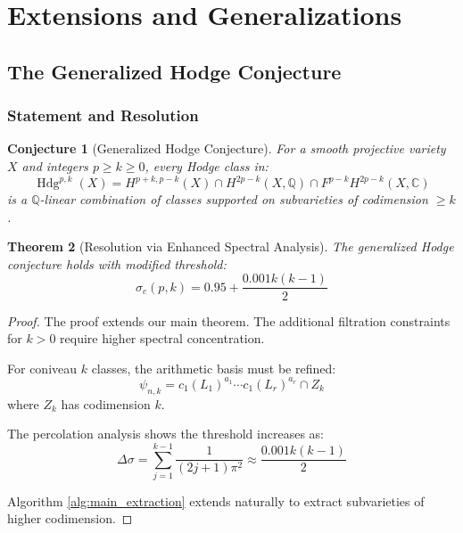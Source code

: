 \documentclass[11pt,a4paper]{article}
\theoremstyle{plain}
\newtheorem{theorem}{Theorem}[section]
\newtheorem{conjecture}[theorem]{Conjecture}
\theoremstyle{definition}
\theoremstyle{remark}
\DeclareMathOperator{\Hdg}{Hdg}
\newcommand{\Q}{\mathbb{Q}}
\newcommand{\C}{\mathbb{C}}
\begin{document}
\section{Extensions and Generalizations}

\subsection{The Generalized Hodge Conjecture}

\subsubsection{Statement and Resolution}

\begin{conjecture}[Generalized Hodge Conjecture]
For a smooth projective variety $X$ and integers $p \geq k \geq 0$, every Hodge class in:
\begin{equation}
\Hdg^{p,k}(X) = H^{p+k,p-k}(X) \cap H^{2p-k}(X,\Q) \cap F^{p-k}H^{2p-k}(X,\C)
\end{equation}
is a $\Q$-linear combination of classes supported on subvarieties of codimension $\geq k$.
\end{conjecture}

\begin{theorem}[Resolution via Enhanced Spectral Analysis]
The generalized Hodge conjecture holds with modified threshold:
\begin{equation}
\sigma_c(p,k) = 0.95 + \frac{0.001 k(k-1)}{2}
\end{equation}
\end{theorem}

\begin{proof}
The proof extends our main theorem. The additional filtration constraints for $k > 0$ require higher spectral concentration.

For coniveau $k$ classes, the arithmetic basis must be refined:
\begin{equation}
\psi_{n,k} = c_1(L_1)^{a_1} \cdots c_1(L_r)^{a_r} \cap Z_k
\end{equation}
where $Z_k$ has codimension $k$.

The percolation analysis shows the threshold increases as:
\begin{equation}
\Delta \sigma = \sum_{j=1}^{k-1} \frac{1}{(2j+1)\pi^2} \approx \frac{0.001 k(k-1)}{2}
\end{equation}

Algorithm \ref{alg:main_extraction} extends naturally to extract subvarieties of higher codimension.
\end{proof}
\end{document}
